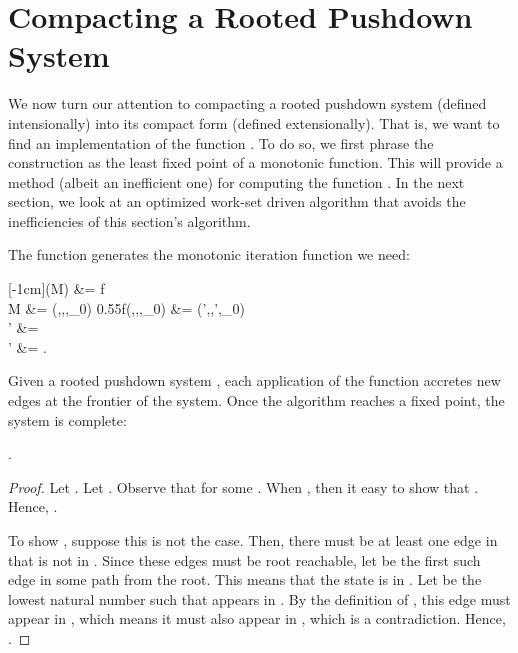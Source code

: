 \section{Compacting a Rooted Pushdown System}
\label{sec:rpds-to-crpds}
We now turn our attention to compacting a rooted pushdown
system (defined intensionally) into its compact form (defined
extensionally).
That is, we want to find an implementation of the function .
To do so, we first phrase the construction as the least fixed point of a monotonic function.
This will provide a method (albeit an inefficient one) for computing
the function .
In the next section, we look at an optimized work-set driven
algorithm that avoids the inefficiencies of this section's algorithm.



The function  generates the monotonic iteration function we need:
\begin{center}
  [-1cm]{\mkCRPDS(M) &= f
    \\
    M &= (\QStates,\StackAlpha,\transfunction,\qstate_0)}
    {0.55}{f(\DSStates,\DSFrames,\DSEdges,\dsstate_0) &=
    (\DSStates',\DSFrames,\DSEdges',\dsstate_0) 
    \\
    \DSStates' &= \DSStates \union {} \union {}
    \\
    \DSEdges' &= \DSEdges \union {} \text.
}
\end{center}
Given a rooted pushdown system , each application of the function
 accretes new edges at the frontier of the system.
Once the algorithm reaches a fixed point, the system is complete:
\begin{theorem}\label{thm:mkCRPDS-correct}
  .
\end{theorem}
\begin{proof}
Let .
Let .
Observe that  for some .
When , then it easy to show that .
Hence, .

  To show , suppose this is not
  the case.
Then, there must be at least one edge in  that is not in
  .
Since these edges must be root reachable, let  be the first such edge in some path from the root.
This means that the state  is in .
Let  be the lowest natural number such that  appears in .
By the definition of , this edge must appear in , which means it must also appear in 
  , which is a contradiction.
Hence, .
\end{proof}



